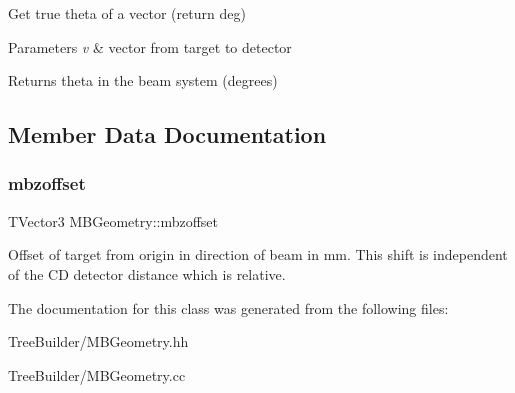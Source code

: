 Get true theta of a vector (return deg) 
\begin{DoxyParams}{Parameters}
{\em v} & vector from target to detector \\
\hline
\end{DoxyParams}
\begin{DoxyReturn}{Returns}
theta in the beam system (degrees) 
\end{DoxyReturn}


\subsection{Member Data Documentation}
\mbox{\label{class_m_b_geometry_a687268aeee7a0e2edc0486a76a07affe}} 
\subsubsection{\texorpdfstring{mbzoffset}{mbzoffset}}
{\footnotesize\ttfamily T\+Vector3 M\+B\+Geometry\+::mbzoffset\hspace{0.3cm}{\ttfamily [private]}}

Offset of target from origin in direction of beam in mm. This shift is independent of the CD detector distance which is relative. 

The documentation for this class was generated from the following files\+:\begin{DoxyCompactItemize}
\item 
Tree\+Builder/M\+B\+Geometry.\+hh\item 
Tree\+Builder/M\+B\+Geometry.\+cc\end{DoxyCompactItemize}
